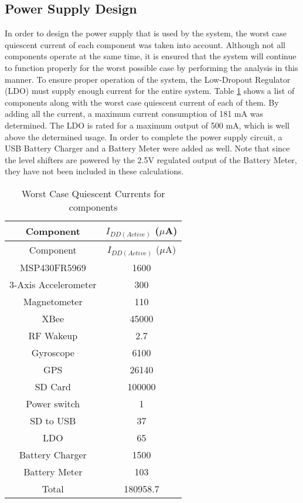 \subsection{Power Supply Design}
In order to design the power supply that is used by the system, the worst case quiescent current of each component was taken into account.  Although not all components operate at the same time, it is ensured that the system will continue to function properly for the worst possible case by performing the analysis in this manner.  To ensure proper operation of the system, the Low-Dropout Regulator (LDO) must supply enough current for the entire system.  Table \ref{tab:powerSupply} shows a list of components along with the worst case quiescent current of each of them.  By adding all the current, a maximum current consumption of 181 mA was determined.  The LDO is rated for a maximum output of 500 mA, which is well above the determined usage.  In order to complete the power supply circuit, a USB Battery Charger and a Battery Meter were added as well. Note that since the level shifters are powered by the 2.5V regulated output of the Battery Meter, they have not been included in these calculations.
\begin{center}
    \begin{longtable}{|c|c|}
    \caption{Worst Case Quiescent Currents for components  \label{tab:powerSupply}} \\
     \hline
    \rowcolor{Gray}
   Component & $I_{DD(Active)}$ ($\mu$A) \\
    \hline \hline \endfirsthead
    
         \hline
    \rowcolor{Gray}
  Component & $I_{DD(Active)}$ ($\mu$A) \\
    \hline \hline \endhead
    
    \endfoot

    MSP430FR5969 & 1600   \\ \hline
    3-Axis Accelerometer & 300  \\ \hline
    Magnetometer & 110  \\ \hline
    XBee  & 45000 \\ \hline
    RF Wakeup & 2.7   \\ \hline
    Gyroscope & 6100  \\ \hline
    GPS   & 26140 \\ \hline
    SD Card & 100000  \\ \hline
    Power switch & 1  \\ \hline
    SD to USB & 37   \\ \hline
    LDO   & 65  \\ \hline
    Battery Charger & 1500  \\ \hline
    Battery Meter & 103   \\ \hline \hline
    Total & 180958.7  \\ \hline     
    \end{longtable}%

\end{center}%
  \vspace{-2cm}

